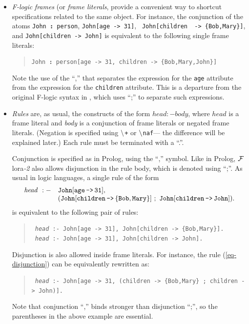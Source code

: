 \documentclass[11pt]{article}
\newcommand{\FLSYSTEM}{{\mbox{\sc ${\cal F}${lora}\rm\emph{-2}}}\xspace}
\newcommand{\isa}{\,{\bf{:}}\,}
\newcommand{\mvd}{{\mbox{\tt \,->\,}}}  %
\newcommand{\fl}{\mbox{F-logic}\xspace}
\newcommand{\PLGNAF}{\mbox{\tt \ensuremath{\tt\backslash}+}\xspace}
\newcommand{\RULELOGNAF}{{\texttt{\ensuremath{\tt\backslash}naf}}\xspace}
\begin{document}
\begin{itemize}
\item
  \emph{F-logic} \emph{frames} (or \emph{frame literals},
  provide a convenient way to shortcut specifications
  related to the same object. For instance, the conjunction of the atoms
  {\tt John{\isa}person}, {\tt John[age{\mvd}31]}, {\tt
  John[children \mvd \{Bob,Mary\}]}, and {\tt John[children\mvd John]}
  is equivalent to the following single frame literals:
  \begin{quote}
    {\tt John{\isa}person[age{\mvd}31, children\mvd\{Bob,Mary,John\}]} 
  \end{quote}
  Note the use of the ``,'' that separates the expression for the {\tt age}
  attribute from the expression for the {\tt children} attribute. This is a
  departure from the original \fl syntax in \cite{KLW95}, which uses ``;'' 
  to separate such expressions.
  
\item \emph{Rules} are, as usual, the constructs of the form $head :-
  body$, where $head$ is a frame literal and \emph{body} is a conjunction of
  frame literals or negated frame literals. (Negation is specified using {\PLGNAF}
    or \RULELOGNAF --- the difference will be explained later.)
  Each rule must be terminated with a ``.''.
  
  Conjunction is specified as in Prolog, using the ``,'' symbol. Like in
  Prolog, \FLSYSTEM also allows disjunction in the rule body, which is denoted
  using ``;''. As usual in logic languages, a single rule of the form
  \begin{equation}\label{eq-disjunction}
    \begin{array}{rl}
    {\it head}~:- & \tt John[age{\mvd}31],\\
                  & \tt (John[children\mvd\{Bob,Mary\}]~;~ John[children\mvd John]).
    \end{array}
  \end{equation}
  is equivalent to the following pair of rules:
  \begin{quote}
  {\tt
    {\it head}~:-~John[age{\mvd}31],~John[children\mvd\{Bob,Mary\}].
    }
  \\
  {\tt
    {\it head}~:-~John[age{\mvd}31],~John[children\mvd John].
    }
  \end{quote}
  Disjunction is also allowed inside frame literals. For instance, the rule
  (\ref{eq-disjunction}) can be equivalently rewritten as:
  \begin{quote}
 {\tt
   {\it head}~:-~John[age{\mvd}31,~(children\mvd\{Bob,Mary\}~;~children\mvd John)].
   }
  \end{quote}
  Note that conjunction ``,'' binds stronger than disjunction ``;'', so the
  parentheses in the above example are essential.
  

\end{itemize}
\end{document}
